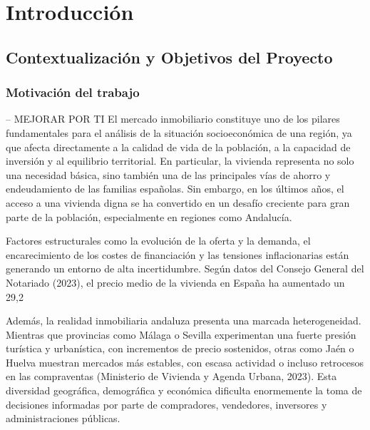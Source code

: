 \documentclass[a4paper,11pt]{book}
\begin{document}
%
%

\tableofcontents
\listoffigures
\listoftables

\mainmatter
\setlength{\parskip}{5pt}

\chapter{Introducción }
\section{Contextualización y Objetivos del Proyecto}
\subsection{Motivación del trabajo}
-- MEJORAR POR TI
El mercado inmobiliario constituye uno de los pilares fundamentales para el análisis de la situación socioeconómica de una región, ya que afecta directamente a la calidad de vida de la población, a la capacidad de inversión y al equilibrio territorial. En particular, la vivienda representa no solo una necesidad básica, sino también una de las principales vías de ahorro y endeudamiento de las familias españolas. Sin embargo, en los últimos años, el acceso a una vivienda digna se ha convertido en un desafío creciente para gran parte de la población, especialmente en regiones como Andalucía.

Factores estructurales como la evolución de la oferta y la demanda, el encarecimiento de los costes de financiación y las tensiones inflacionarias están generando un entorno de alta incertidumbre. Según datos del Consejo General del Notariado (2023), el precio medio de la vivienda en España ha aumentado un 29,2%

Además, la realidad inmobiliaria andaluza presenta una marcada heterogeneidad. Mientras que provincias como Málaga o Sevilla experimentan una fuerte presión turística y urbanística, con incrementos de precio sostenidos, otras como Jaén o Huelva muestran mercados más estables, con escasa actividad o incluso retrocesos en las compraventas (Ministerio de Vivienda y Agenda Urbana, 2023). Esta diversidad geográfica, demográfica y económica dificulta enormemente la toma de decisiones informadas por parte de compradores, vendedores, inversores y administraciones públicas.
\end{document}
